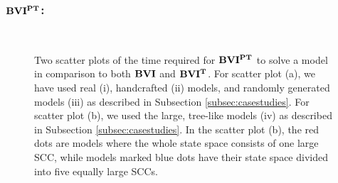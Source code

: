 \subsubsection*{\underline{$\TOPAlg$}:}
\begin{figure}[h!]
    \centering
    \
    \caption[$\TOPAlg$ compared to $\BVI$ with and without the topological optimization]{
        Two scatter plots of the time required for $\TOPAlg$ to solve a model in comparison to both $\BVI$ and $\mathbf{BVI^T}$.
        For scatter plot (a), we have used real (i), handcrafted (ii) models, and randomly generated models (iii) as described in Subsection \ref{subsec:casestudies}.
        For scatter plot (b), we used the large, tree-like models (iv) as described in Subsection \ref{subsec:casestudies}. In the scatter plot (b),
        the red dots are models where the whole state space consists of one large SCC, while models marked blue dots have their state space divided into five equally large SCCs.
    }
    \label{fig:colorScatterBviTop}
\end{figure}
\FloatBarrier


